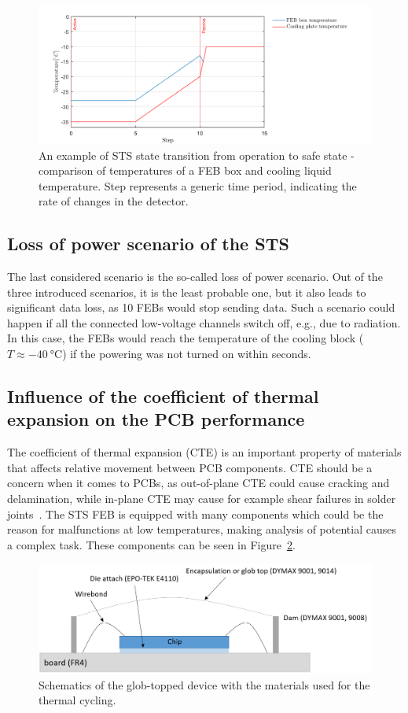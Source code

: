 \begin{figure}[!h]
\centering
\includegraphics[width=0.85\columnwidth]{Chapter4/images/nominal.png}
\caption{An example of \gls{STS} state transition from operation to safe state - comparison of temperatures of a \gls{FEB} box and cooling liquid temperature. Step represents a generic time period, indicating the rate of changes in the detector.}
\label{fig_reboot_nominal2}
\end{figure}

\subsection{Loss of power scenario of the STS}
\label{power_loss}
The last considered scenario is the so-called loss of power scenario. Out of the three introduced scenarios, it is the least probable one, but it also leads to significant data loss, as 10 \glspl{FEB} would stop sending data. Such a scenario could happen if all the connected low-voltage channels switch off, e.g., due to radiation. In this case, the \glspl{FEB} would reach the temperature of the cooling block ($T \approx \SI{-40}{\celsius}$) if the powering was not turned on within seconds.

\subsection{Influence of the coefficient of thermal expansion on the PCB performance}

The coefficient of thermal expansion (\gls{CTE}) is an important property of materials that affects relative movement between \gls{PCB} components. \gls{CTE} should be a concern when it comes to \glspl{PCB}, as out-of-plane \gls{CTE} could cause cracking and delamination, while in-plane \gls{CTE} may cause for example shear failures in solder joints~\cite{cte_report}. The \gls{STS} \gls{FEB} is equipped with many components which could be the reason for malfunctions at low temperatures, making analysis of potential causes a complex task. 
These components can be seen in Figure~\ref{fig_globtop}.
\begin{figure}[!h]
\centering
\includegraphics[width=0.85\columnwidth]{Chapter4/images/glob_topped_device.png}
\caption{Schematics of the glob-topped device with the materials used for the thermal cycling.}
\label{fig_globtop}
\end{figure}

